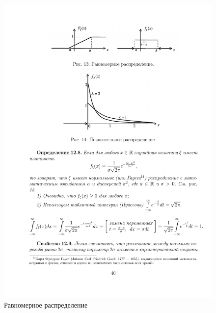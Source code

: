 \begin{figure}[H]
	\centering
	\includegraphics[]{pic/pic13}
	\caption{Равномерное распределение}
	\label{fig13}
\end{figure}
